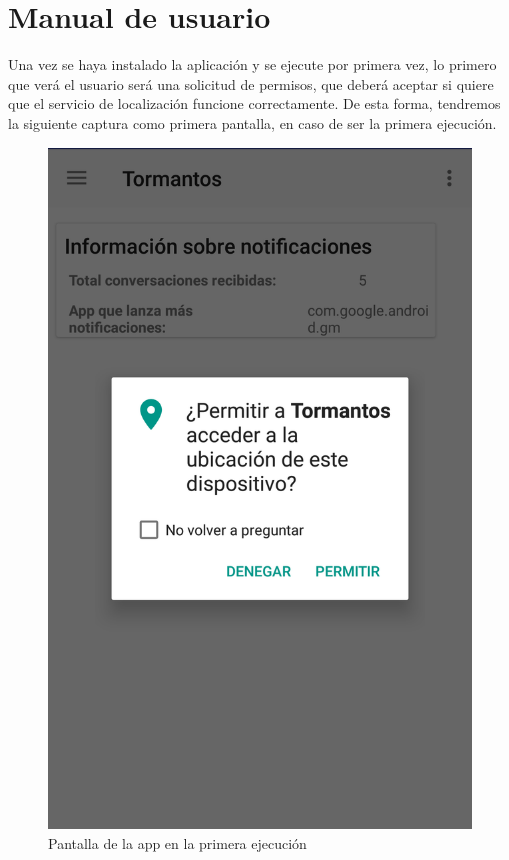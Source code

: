 \documentclass[12pt,a4paper,oneside]{book} %
\begin{document}
\section{Manual de usuario}
Una vez se haya instalado la aplicación y se ejecute por primera vez, lo primero que verá el usuario será una solicitud de permisos, que deberá aceptar si quiere que el servicio de localización funcione correctamente. De esta forma, tendremos la siguiente captura como primera pantalla, en caso de ser la primera ejecución. 
\begin{figure}[H]
	\begin{center}
     	\includegraphics[scale=0.2]{pictures/capsapp/home3.png}
	    	\caption{Pantalla de la app en la primera ejecución}
    	\label{fig:Pantalla de la app en la primera ejecucion}
	\end{center}
\end{figure}
\end{document}
